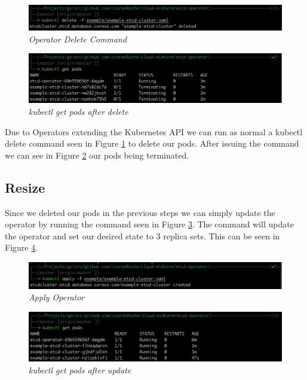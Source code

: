\begin{figure}[!hb]
\centering
\includegraphics*[width=1\textwidth]{images/op4.png}
\caption{\em Operator Delete Command}
\label{img:op_4}
\end{figure}

\begin{figure}[!ht]
\centering
\includegraphics*[width=1\textwidth]{images/op5.png}
\caption{\em kubectl get pods after delete}
\label{img:op_5}
\end{figure}
\newpage
Due to Operators extending the Kubernetes API we can run as normal a kubectl delete command seen in Figure \ref{img:op_4} to delete our pods. After issuing the command we can see in Figure \ref{img:op_5} our pods being terminated.

\subsection{Resize}
Since we deleted our pods in the previous steps we can simply update the operator by running the command seen in Figure \ref{img:op_6}. The command will update the operator and set our desired state to 3 replica sets. This can be seen in Figure \ref{img:op_7}.
\begin{figure}[!ht]
\centering
\includegraphics*[width=1\textwidth]{images/op6.png}
\caption{\em Apply Operator}
\label{img:op_6}
\end{figure}

\begin{figure}[!ht]
\centering
\includegraphics*[width=1\textwidth]{images/op7.png}
\caption{\em kubectl get pods after update}
\label{img:op_7}
\end{figure}


